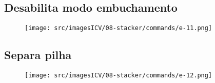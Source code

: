 \newpage
\thispagestyle{fancy}
\vspace{\fill}
\subsection{\small Desabilita modo embuchamento}
\begin{figure}
    \centering
    \texttt{[image: src/imagesICV/08-stacker/commands/e-11.png]}
\end{figure}

\newpage
\thispagestyle{fancy}
\vspace{\fill}
\subsection{\small Separa pilha}
\begin{figure}
    \centering
    \texttt{[image: src/imagesICV/08-stacker/commands/e-12.png]}
\end{figure}

